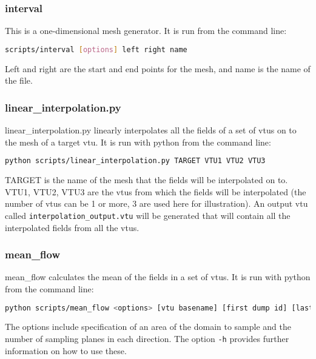 
\subsubsection{interval}
\label{sect:interval}

This is a one-dimensional mesh generator. It is run from the command line:
\begin{lstlisting}[language = Bash]
scripts/interval [options] left right name 
\end{lstlisting}
Left and right are the start and end points for the mesh, and name is the name of the file.


\subsubsection{linear\_interpolation.py}
\label{sect:scripts_linear_interpolation}
linear\_interpolation.py linearly interpolates all the fields of a set of vtus on to the mesh of a target vtu. It is run with python from the command line:
\begin{lstlisting}[language = Bash]
python scripts/linear_interpolation.py TARGET VTU1 VTU2 VTU3 
\end{lstlisting}
TARGET is the name of the mesh that the fields will be interpolated on to. VTU1, VTU2, VTU3 are the vtus from which the fields will be interpolated (the number of vtus can be 1 or more, 3 are used here for illustration). An output vtu called \lstinline[language = Bash]+interpolation_output.vtu+ will be generated that will contain all the interpolated fields from all the vtus. 

 
\subsubsection{mean\_flow}
\label{sect:mean_flow}

mean\_flow calculates the mean of the fields in a set of vtus. It is run with python from the command line:
\begin{lstlisting}[language = Bash]
python scripts/mean_flow <options> [vtu basename] [first dump id] [last dump id]
\end{lstlisting}
The options include specification of an area of the domain to sample and the number of sampling planes in each direction. The option \lstinline[language = Bash]+-h+ provides further information on how to use these.

